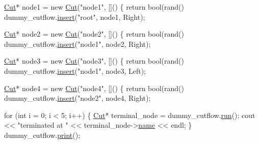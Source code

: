 \begin{DoxyEnumerate}
\begin{DoxyCode}
\hyperlink{classCut}{Cut}* node1 = \textcolor{keyword}{new} \hyperlink{classCut}{Cut}(\textcolor{stringliteral}{"node1"}, []() \{ \textcolor{keywordflow}{return} bool(rand() %
dummy\_cutflow.\hyperlink{classCutflow_a8da46f1053a6b97991489ee0920c29a1}{insert}(\textcolor{stringliteral}{"root"}, node1, Right);

\hyperlink{classCut}{Cut}* node2 = \textcolor{keyword}{new} \hyperlink{classCut}{Cut}(\textcolor{stringliteral}{"node2"}, []() \{ \textcolor{keywordflow}{return} bool(rand() %
dummy\_cutflow.\hyperlink{classCutflow_a8da46f1053a6b97991489ee0920c29a1}{insert}(\textcolor{stringliteral}{"node1"}, node2, Right);

\hyperlink{classCut}{Cut}* node3 = \textcolor{keyword}{new} \hyperlink{classCut}{Cut}(\textcolor{stringliteral}{"node3"}, []() \{ \textcolor{keywordflow}{return} bool(rand() %
dummy\_cutflow.\hyperlink{classCutflow_a8da46f1053a6b97991489ee0920c29a1}{insert}(\textcolor{stringliteral}{"node1"}, node3, Left);

\hyperlink{classCut}{Cut}* node4 = \textcolor{keyword}{new} \hyperlink{classCut}{Cut}(\textcolor{stringliteral}{"node4"}, []() \{ \textcolor{keywordflow}{return} bool(rand() %
dummy\_cutflow.\hyperlink{classCutflow_a8da46f1053a6b97991489ee0920c29a1}{insert}(\textcolor{stringliteral}{"node2"}, node4, Right);

\textcolor{keywordflow}{for} (\textcolor{keywordtype}{int} i = 0; i < 5; i++)
\{
    \hyperlink{classCut}{Cut}* terminal\_node = dummy\_cutflow.\hyperlink{classCutflow_a563da4fc41aa5c611dd0ce37ce966f2c}{run}();
    cout << \textcolor{stringliteral}{"terminated at "} << terminal\_node->\hyperlink{classCut_accf700d2d00746b97a265d4aea3f55c2}{name} << endl;
\}
dummy\_cutflow.\hyperlink{classCutflow_a5d9f9fa315303fa9f63738dd41c05042}{print}();
\end{DoxyCode}
 
\end{DoxyEnumerate}